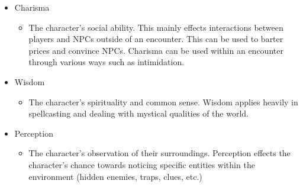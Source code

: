 \documentclass[12pt,a4paper]{report}
\begin{document}
\begin{itemize}
\begin{itemize}
			\end{itemize}
			\item Charisma
			\begin{itemize}
				\item The character's social ability. This mainly effects interactions between players and NPCs outside of an encounter. This can be used to barter prices and convince NPCs. Charisma can be used within an encounter through various ways such as intimidation. 
			\end{itemize}
			\item Wisdom
			\begin{itemize}
				\item The character's spirituality and common sense. Wisdom applies heavily in spellcasting and dealing with mystical qualities of the world. 
			\end{itemize}
			\item Perception
			\begin{itemize}
				\item The character's observation of their surroundings. Perception effects the character's chance towards noticing specific entities within the environment (hidden enemies, traps, clues, etc.)
			\end{itemize}
		\end{itemize}
		\newpage
\end{document}

